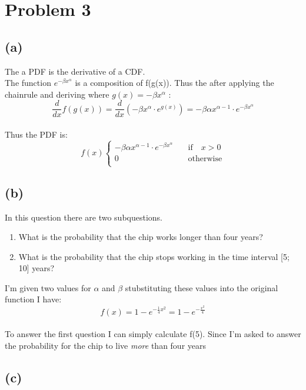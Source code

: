 \section{Problem 3}
\subsection{(a)}
The a PDF is the derivative of a CDF.
\\
The function $e^{- \beta x^{\alpha}}$ is a composition of f(g(x)). 
Thus the after applying the chainrule and deriving where $g(x) = - \beta x^{\alpha} $ :
$$\frac{d}{dx} f(g(x)) = \frac{d}{dx} (- \beta x^{\alpha} \cdot e^{{g(x)}}) = - \beta \alpha x^{\alpha-1} \cdot e^{- \beta x^{\alpha}} $$
\\
Thus the PDF is:
\[f(x) \begin{cases}
    - \beta \alpha x^{\alpha-1} \cdot e^{- \beta x^{\alpha}} & \quad \text{if} \quad x > 0 \\
    0 & \quad \text{otherwise} \\
 \end{cases}
\]

\subsection{(b)}
In this question there are two subquestions.
\begin{enumerate}
    \item What is the probability that the chip works longer than four years?
    \item What is the probability that the chip stops working in the time interval [5;
    10] years?
\end{enumerate}
I'm given two values for $\alpha$ and $\beta$ stubstituting these values into the original
function I have:
$$ f(x) = 1 - e^{-\frac{1}{4}x^2} = 1 - e^{-\frac{x^2}{4}} $$
\\
To answer the first question I can simply calculate f(5). Since I'm asked to answer the probability
for the chip to live \emph{more} than four years
\subsection{(c)}